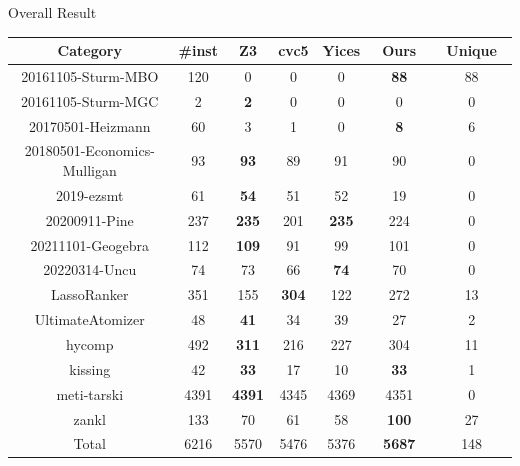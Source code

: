 \begin{frame}{Overall Result}
    \begin{table}[!t]
        \centering
        \small
        \begin{tabular}{c | c | c | c | c | c | c}
                    Category & \#inst & Z3 & cvc5 & Yices & ~Ours~ & ~Unique~ \\ \hline
                    20161105-Sturm-MBO & 120 & 0 & 0 & 0 & \textbf{88} & 88 \\
                    20161105-Sturm-MGC & 2 & \textbf{2} & 0 & 0 & 0 & 0 \\
                    20170501-Heizmann & 60 & 3 & 1 & 0 & \textbf{8} & 6 \\
                    20180501-Economics-Mulligan & 93 & \textbf{93} & 89 & 91 & 90 & 0 \\
                    2019-ezsmt & 61 & \textbf{54} & 51 & 52 & 19 & 0 \\
                    20200911-Pine & 237 & \textbf{235} & 201 & \textbf{235} & 224 & 0 \\
                    20211101-Geogebra & 112 & \textbf{109} & 91 & 99 & 101 & 0 \\
                    20220314-Uncu & 74 & 73 & 66 & \textbf{74} & 70 & 0 \\
                    LassoRanker & 351 & 155 & \textbf{304} & 122 & 272 & 13\\
                    UltimateAtomizer & 48 & \textbf{41} & 34 & 39 & 27 & 2 \\
                    hycomp & 492 & \textbf{311} & 216 & 227 & 304 & 11 \\
                    kissing & 42 & \textbf{33} & 17 & 10 & \textbf{33} & 1 \\
                    meti-tarski & 4391 & \textbf{4391} & 4345 & 4369 & 4351 & 0 \\
                    zankl & 133 & 70 & 61 & 58 & \textbf{100} & 27 \\ \hline
                    Total & 6216 & 5570 & 5476 & 5376 & \textbf{5687} & 148 
                \end{tabular}
        \end{table}
\end{frame}

